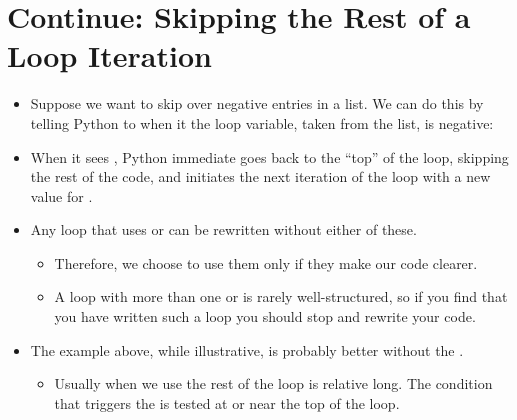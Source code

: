 \documentclass[letterpaper,10pt,english]{sphinxmanual}
\begin{document}
\section{Continue: Skipping the Rest of a Loop Iteration}
\label{\detokenize{lecture_notes/lec12_loops2_for_double:continue-skipping-the-rest-of-a-loop-iteration}}\begin{itemize}
\item {} 
Suppose we want to skip over negative entries in a list. We can do
this by telling Python to  when it the loop variable,
taken from the list, is negative:

%
\begin{sphinxVerbatim}[commandchars=\\\{\}]
   
       
\end{sphinxVerbatim}

\item {} 
When it sees , Python immediate goes back to the “top”
of the loop, skipping the rest of the code, and initiates the next
iteration of the loop with a new value for .

\item {} 
Any loop that uses  or  can be rewritten
without either of these.
\begin{itemize}
\item {} 
Therefore, we choose to use them only if they make our code
clearer.

\item {} 
A loop with more than one  or  is rarely
well-structured, so if you find that you have written such a
loop you should stop and rewrite your code.

\end{itemize}

\item {} 
The example above, while illustrative, is probably better without
the .
\begin{itemize}
\item {} 
Usually when we use  the rest of the loop is
relative long. The condition that triggers the  is
tested at or near the top of the loop.

\end{itemize}

\end{itemize}
\end{document}
